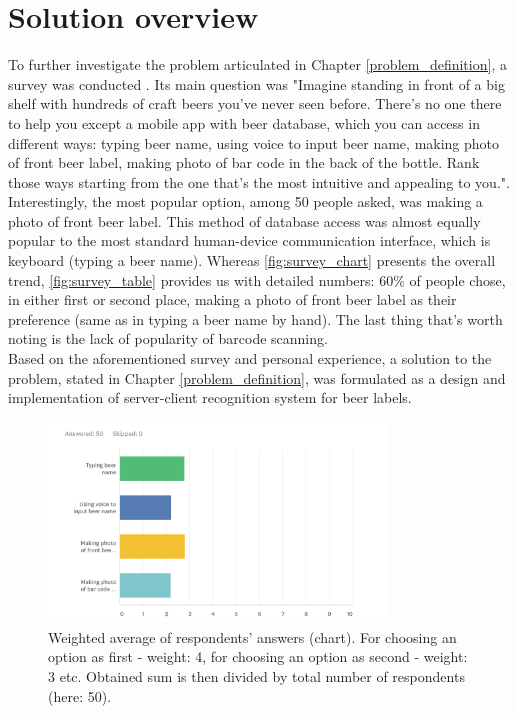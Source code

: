 \documentclass[11pt]{article}
\begin{document}
\section{Solution overview} \label{solution_overview}
To further investigate the problem articulated in Chapter \ref{problem_definition}, a survey was conducted \cite{survey}. Its main question was "Imagine standing in front of a big shelf with hundreds of craft beers you've never seen before. There's no one there to help you except a mobile app with beer database, which you can access in different ways: typing beer name, using voice to input beer name, making photo of front beer label, making photo of bar code in the back of the bottle. Rank those ways starting from the one that's the most intuitive and appealing to you.". Interestingly, the most popular option, among 50 people asked, was making a photo of front beer label. This method of database access was almost equally popular to the most standard human-device communication interface, which is keyboard (typing a beer name). Whereas \autoref{fig:survey_chart} presents the overall trend, \autoref{fig:survey_table} provides us with detailed numbers: 60\% of people chose, in either first or second place, making a photo of front beer label as their preference (same as in typing a beer name by hand). The last thing that's worth noting is the lack of popularity of barcode scanning.\\

Based on the aforementioned survey and personal experience, a solution to the problem, stated in Chapter \ref{problem_definition}, was formulated as a design and implementation of server-client recognition system for beer labels.

\begin{figure}[h]
\includegraphics[width=0.8\textwidth]{survey_chart}
\centering
\caption{Weighted average of respondents' answers (chart). For choosing an option as first - weight: 4, for choosing an option as second - weight: 3 etc. Obtained sum is then divided by total number of respondents (here: 50).}
\label{fig:survey_chart}
\end{figure}
\end{document}
